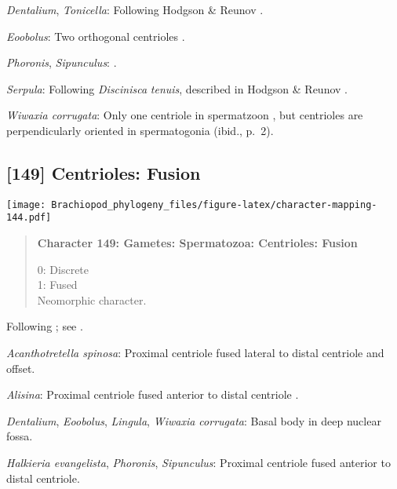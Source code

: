 \documentclass[openany]{book}
\theoremstyle{definition}
\theoremstyle{definition}
\theoremstyle{definition}
\theoremstyle{remark}
\begin{document}
\hypertarget{Dentalium-coding-148}{}
\emph{Dentalium}, \emph{Tonicella}: Following Hodgson \& Reunov
\citeyearpar{Hodgson1994Ultrastructureof}.

\hypertarget{Eoobolus-coding-148}{}
\emph{Eoobolus}: Two orthogonal centrioles
\citep{Afzelius1978Finestructure}.

\hypertarget{Phoronis-coding-148}{}
\emph{Phoronis}, \emph{Sipunculus}: \citep{Franzen1981}.

\hypertarget{Serpula-coding-148}{}
\emph{Serpula}: Following \emph{Discinisca} \emph{tenuis}, described in
Hodgson \& Reunov \citeyearpar{Hodgson1994Ultrastructureof}.

\hypertarget{Wiwaxia_corrugata-coding-148}{}
\emph{Wiwaxia corrugata}: Only one centriole in spermatzoon
\citep[p.~7]{Reunov2004Ultrastructuralstudy}, but centrioles are
perpendicularly oriented in spermatogonia (ibid., p.~2).

\subsection*{{[}149{]} Centrioles: Fusion}\label{centrioles-fusion}

\texttt{[image: Brachiopod\_phylogeny\_files/figure-latex/character-mapping-144.pdf]}

\begin{quote}
\textbf{Character 149: Gametes: Spermatozoa: Centrioles: Fusion}

0: Discrete\\
1: Fused\\
Neomorphic character.
\end{quote}

Following \citet{Smith2012}; see \citet{BucklandNicks2008}.

\hypertarget{Acanthotretella_spinosa-coding-149}{}
\emph{Acanthotretella spinosa}: Proximal centriole fused lateral to
distal centriole and offset.

\hypertarget{Alisina-coding-149}{}
\emph{Alisina}: Proximal centriole fused anterior to distal centriole
\citep{DufresneDube1983}.

\hypertarget{Dentalium-coding-149}{}
\emph{Dentalium}, \emph{Eoobolus}, \emph{Lingula}, \emph{Wiwaxia
corrugata}: Basal body in deep nuclear fossa.

\hypertarget{Halkieria_evangelista-coding-149}{}
\emph{Halkieria evangelista}, \emph{Phoronis}, \emph{Sipunculus}:
Proximal centriole fused anterior to distal centriole.
\end{document}
